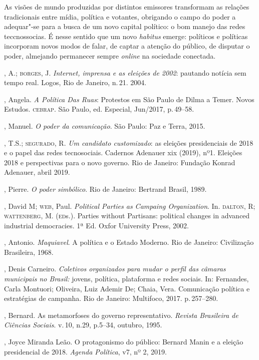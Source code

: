 As visões de mundo produzidas por distintos emissores transformam as
relações tradicionais entre mídia, política e votantes, obrigando o
campo do poder a adequar"-se para a busca de um novo capital político: o
bom manejo das redes teccnossocias. É nesse sentido que um novo
\emph{habitus} emerge: políticos e políticas incorporam novos modos de
falar, de captar a atenção do público, de disputar o poder, almejando
permanecer sempre \emph{online} na sociedade conectada.


\begin{bibliohedra}
, A.; \textsc{borges}, J. \emph{Internet, imprensa e as eleições de 2002}:
pautando notícia sem tempo real. Logos, Rio de Janeiro, n.\,21. 2004.

, Angela. \emph{A Política Das Ruas}: Protestos em São Paulo de
Dilma a Temer. Novos Estudos. \textsc{cebrap}. São Paulo, ed. Especial, Jun/2017,
p.\,49--58.

, Manuel. \emph{O poder da comunicação}. São Paulo: Paz e
Terra, 2015.

, T.S.; \textsc{segurado}, R. \emph{Um candidato customizado}: as
eleições presidenciais de 2018 e o papel das redes tecnosociais.
Cadernos Adenauer xix (2019), nº1. Eleições 2018 e perspectivas para o
novo governo. Rio de Janeiro: Fundação Konrad Adenauer, abril 2019.

, Pierre. \emph{O poder simbólico}. Rio de Janeiro: Bertrand
Brasil, 1989.

, David M; \textsc{web}, Paul. \emph{Political Parties as Campaing
Organization}. In. \textsc{dalton}, R; \textsc{wattenberg}, M. (\textsc{ed}s.). Parties without
Partisans: political changes in advanced industrial democracies. 1ª Ed.
Oxfor University Press, 2002.

, Antonio. \emph{Maquiavel}. A política e o Estado Moderno. Rio
de Janeiro: Civilização Brasileira, 1968.

, Denis Carneiro. \emph{Coletivos organizados para mudar o perfil
das câmaras municipais no Brasil:} jovens, política, plataforma e redes
sociais. In: Fernandes, Carla Montuori; Oliveira, Luiz Ademir De; Chaia,
Vera. Comunicação política e estratégias de campanha. Rio de Janeiro:
Multifoco, 2017. p.\,257--280.

, Bernard. As metamorfoses do governo representativo.
\emph{Revista Brasileira de Ciências Sociais}. v.\,10, n.29, p.5--34,
outubro, 1995.

, Joyce Miranda Leão. O protagonismo do público: Bernard Manin e
a eleição presidencial de 2018. \emph{Agenda Política}, v7, nº 2,
2019.


\end{bibliohedra}
